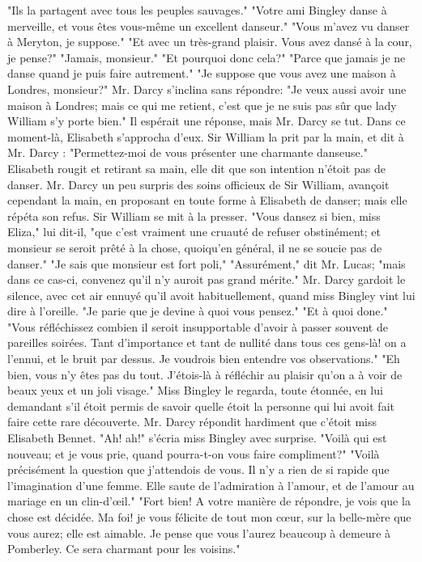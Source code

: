 "Ils la partagent avec tous les peuples sauvages."
"Votre ami Bingley danse à merveille, et vous êtes vous-même un excellent danseur."
"Vous m'avez vu danser à Meryton, je suppose."
"Et avec un très-grand plaisir. Vous avez dansé à la cour, je pense?"
"Jamais, monsieur."
"Et pourquoi donc cela?"
"Parce que jamais je ne danse quand je puis faire autrement."
"Je suppose que vous avez une maison à Londres, monsieur?"
Mr. Darcy s'inclina sans répondre:
\setcounter{page}{386}
"Je veux aussi avoir une maison à Londres; mais ce qui me retient, c'est que je ne suis pas sûr que lady William s'y porte bien."
Il espérait une réponse, mais Mr. Darcy se tut. Dans ce moment-là, Elisabeth s'approcha d'eux. Sir William la prit par la main, et dit à Mr. Darcy : "Permettez-moi de vous présenter une charmante danseuse." Elisabeth rougit et retirant sa main, elle dit que son intention n'étoit pas de danser. Mr. Darcy un peu surpris des soins officieux de Sir William, avançoit cependant la main, en proposant en toute forme à Elisabeth de danser; mais elle répéta son refus. Sir William se mit à la presser. "Vous dansez si bien, miss Eliza," lui dit-il, "que c'est vraiment une cruauté de refuser obstinément; et monsieur se seroit prêté à la chose, quoiqu'en général, il ne se soucie pas de danser."
"Je sais que monsieur est fort poli,"
"Assurément," dit Mr. Lucas; "mais dans ce cas-ci, convenez qu'il n'y auroit pas grand mérite."
Mr. Darcy gardoit le silence, avec cet air ennuyé qu'il avoit habituellement, quand miss Bingley vint lui dire à l'oreille. "Je parie que je devine à quoi vous pensez."
\setcounter{page}{387}
"Et à quoi done."
"Vous réfléchissez combien il seroit insupportable d'avoir à passer souvent de pareilles soirées. Tant d'importance et tant de nullité dans tous ces gens-là! on a l'ennui, et le bruit par dessus. Je voudrois bien entendre vos observations."
"Eh bien, vous n'y êtes pas du tout. J'étois-là à réfléchir au plaisir qu'on a à voir de beaux yeux et un joli visage."
Miss Bingley le regarda, toute étonnée, en lui demandant s'il étoit permis de savoir quelle étoit la personne qui lui avoit fait faire cette rare découverte.
Mr. Darcy répondit hardiment que c'étoit miss Elisabeth Bennet.
"Ah! ah!" s'écria miss Bingley avec surprise. "Voilà qui est nouveau; et je vous prie, quand pourra-t-on vous faire compliment?"
"Voilà précisément la question que j'attendois de vous. Il n'y a rien de si rapide que l'imagination d'une femme. Elle saute de l'admiration à l'amour, et de l'amour au mariage en un clin-d'œil."
"Fort bien! A votre manière de répondre, je vois que la chose est décidée. Ma foi! je vous félicite de tout mon cœur, sur la belle-mère que vous aurez; elle est aimable.\setcounter{page}{388} Je pense que vous l'aurez beaucoup à demeure à Pomberley. Ce sera charmant pour les voisins."
